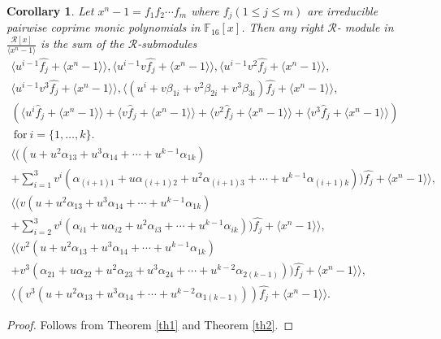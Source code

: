 \documentclass{amsart}
\newtheorem{corollary}[theorem]{Corollary}
\theoremstyle{definition}
\theoremstyle{remark}
\numberwithin{equation}{section}
\begin{document}
        \begin{corollary}\label{cor1}
	Let $x^n-1=f_1f_2\cdots f_m$ where $f_j(1\leq j\leq m)$ are irreducible pairwise        coprime monic polynomials in $\mathbb F_{16}[x]$. Then any right $\mathcal{R}$-         module in $\frac{\mathcal{R}[x]}{\langle x^n-1\rangle}$ is the sum of the               $\mathcal{R}$-submodules
        \allowdisplaybreaks \begin{gather*} \langle u^{i-1}\hat{f_j} + \langle x^n-1\rangle \rangle, \langle u^{i-1}v\hat{f_j} + \langle x^n-1\rangle \rangle, \langle u^{i-1}v^2\hat{f_j} + \langle x^n-1\rangle \rangle , \\ \langle u^{i-1}v^3\hat{f_j} + \langle x^n-1\rangle \rangle,  
        \langle (u^i+ v\beta_{1i} + v^2\beta_{2i} + v^3\beta_{3i})\hat{f_j} + \langle x^n-1\rangle \rangle ,\\ (\langle u^i \hat{f}_j + \langle x^n-1\rangle\rangle + \langle v\hat{f}_j + \langle x^n-1\rangle\rangle + \langle v^2\hat{f}_j  + \langle x^n-1\rangle\rangle + \langle v^3\hat{f}_j + \langle x^n-1\rangle\rangle)\\  ~ \text{for}~  i= \{1,\dots,k\}. \\
        \langle ((u + u^2\alpha_{13} + u^3\alpha_{14} + \cdots + u^{k-1}\alpha_{1k}) \\ + \sum_{i=1}^{3} v^i( \alpha_{(i+1)1} + u\alpha_{(i+1)2} + u^2\alpha_{(i+1)3} + \cdots + u^{k-1}\alpha_{(i+1)k} ))\hat{f_j} + \langle x^n-1\rangle \rangle ,\\
        \langle (v(u + u^2\alpha_{13} + u^3\alpha_{14} + \cdots + u^{k-1}\alpha_{1k}) \\ + \sum_{i=2}^{3} v^i( \alpha_{i1} + u\alpha_{i2} + u^2\alpha_{i3}  + \cdots + u^{k-1}\alpha_{ik} ))\hat{f_j} + \langle x^n-1\rangle \rangle , \\ \langle (v^2(u + u^2\alpha_{13} + u^3\alpha_{14} + \cdots + u^{k-1}\alpha_{1k}) \\ + v^3( \alpha_{21} + u\alpha_{22} + u^2\alpha_{23} + u^3\alpha_{24} + \cdots + u^{k-2}\alpha_{2(k-1)}))\hat{f_j} + \langle x^n-1\rangle \rangle, \\ \langle (v^3(u + u^2\alpha_{13} + u^3\alpha_{14} + \cdots + u^{k-2}\alpha_{1(k-1)}))\hat{f_j} + \langle x^n-1\rangle \rangle.
        \end{gather*}
		
        \end{corollary}
        
        \begin{proof}
        
	Follows from Theorem \ref{th1} and Theorem \ref{th2}.
    
	 \end{proof}
    
\end{document}
